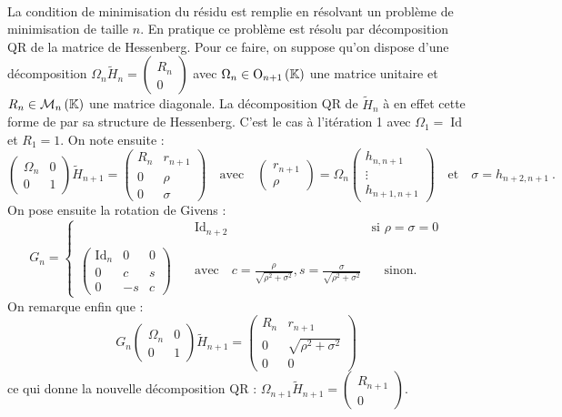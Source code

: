 		\paragraph{}
		La condition de minimisation du résidu est remplie en résolvant un problème de minimisation de taille $n$.
		En pratique ce problème est résolu par décomposition QR de la matrice de Hessenberg.
		Pour ce faire, on suppose qu'on dispose d'une décomposition $\Omega_n\widetilde{H}_n = \begin{pmatrix}R_n \\ 0\end{pmatrix}$ avec $\Omega_n\in\operatorname{O}_{n+1}\left(\mathbb{K}\right)$ une matrice unitaire et $R_n\in\mathcal{M}_{n}\left(\mathbb{K}\right)$ une matrice diagonale.
		La décomposition QR de $\widetilde{H}_n$ à en effet cette forme de par sa structure de Hessenberg.
		C'est le cas à l'itération 1 avec $\Omega_1 = \operatorname{Id}$ et $R_1 = 1$.
		On note ensuite :
		\[\begin{pmatrix}\Omega_n & 0 \\ 0 & 1\end{pmatrix}\widetilde{H}_{n+1} = \begin{pmatrix}R_n & r_{n+1} \\ 0 & \rho \\ 0 & \sigma\end{pmatrix} \quad\textrm{avec}\quad \begin{pmatrix}r_{n+1} \\ \rho\end{pmatrix} = \Omega_n\begin{pmatrix}h_{n,n+1} \\ \vdots \\ h_{n+1,n+1}\end{pmatrix} \quad\textrm{et}\quad \sigma = h_{n+2,n+1}\ .\]
		On pose ensuite la rotation de Givens :
		\[G_n = \left\{\begin{aligned}
			&\quad\operatorname{Id}_{n+2} &\textrm{si }\rho = \sigma = 0\\ \\
			\begin{pmatrix}\operatorname{Id}_n & 0 & 0 \\ 0 & c & s \\ 0 & -s & c\end{pmatrix}& \quad\textrm{avec}\quad c = \frac{\rho}{\sqrt{\rho^2 + \sigma^2}}, s = \frac{\sigma}{\sqrt{\rho^2 + \sigma^2}} &\quad\textrm{sinon.}
		\end{aligned}\right.\]
		On remarque enfin que :
		\[G_n\begin{pmatrix}\Omega_n & 0 \\ 0 & 1\end{pmatrix}\widetilde{H}_{n+1} = \begin{pmatrix}R_n & r_{n+1} \\ 0 & \sqrt{\rho^2 + \sigma^2} \\ 0 & 0\end{pmatrix}\]
		ce qui donne la nouvelle décomposition QR : $\Omega_{n+1}\widetilde{H}_{n+1} = \begin{pmatrix}R_{n+1} \\ 0\end{pmatrix}$.


